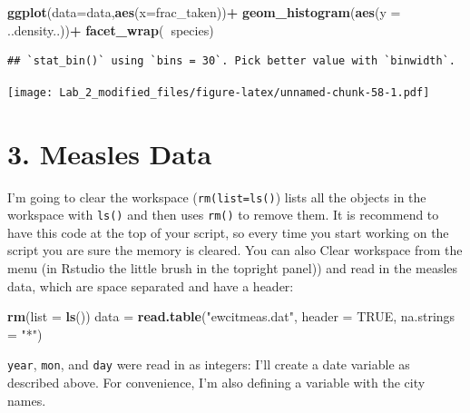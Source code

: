 \documentclass[11pt,]{article}
\newenvironment{Shaded}{\begin{snugshade}}{\end{snugshade}}
\newcommand{\KeywordTok}[1]{\textcolor[rgb]{0.13,0.29,0.53}{\textbf{#1}}}
\newcommand{\DataTypeTok}[1]{\textcolor[rgb]{0.13,0.29,0.53}{#1}}
\newcommand{\DecValTok}[1]{\textcolor[rgb]{0.00,0.00,0.81}{#1}}
\newcommand{\StringTok}[1]{\textcolor[rgb]{0.31,0.60,0.02}{#1}}
\newcommand{\OtherTok}[1]{\textcolor[rgb]{0.56,0.35,0.01}{#1}}
\newcommand{\OperatorTok}[1]{\textcolor[rgb]{0.81,0.36,0.00}{\textbf{#1}}}
\newcommand{\NormalTok}[1]{#1}
\begin{document}
\begin{Shaded}
\begin{Highlighting}[]
\KeywordTok{ggplot}\NormalTok{(}\DataTypeTok{data=}\NormalTok{data,}\KeywordTok{aes}\NormalTok{(}\DataTypeTok{x=}\NormalTok{frac_taken))}\OperatorTok{+}
\StringTok{  }\KeywordTok{geom_histogram}\NormalTok{(}\KeywordTok{aes}\NormalTok{(}\DataTypeTok{y =}\NormalTok{ ..density..))}\OperatorTok{+}
\StringTok{  }\KeywordTok{facet_wrap}\NormalTok{(}\OperatorTok{~}\NormalTok{species)}
\end{Highlighting}
\end{Shaded}

\begin{verbatim}
## `stat_bin()` using `bins = 30`. Pick better value with `binwidth`.
\end{verbatim}

\texttt{[image: Lab\_2\_modified\_files/figure-latex/unnamed-chunk-58-1.pdf]}

\section{3. Measles Data}\label{measles-data}

I'm going to clear the workspace (\texttt{rm(list=ls()}) lists all the
objects in the workspace with \texttt{ls()} and then uses \texttt{rm()}
to remove them. It is recommend to have this code at the top of your
script, so every time you start working on the script you are sure the
memory is cleared. You can also Clear workspace from the menu (in
Rstudio the little brush in the topright panel)) and read in the measles
data, which are space separated and have a header:

\begin{Shaded}
\begin{Highlighting}[]
\KeywordTok{rm}\NormalTok{(}\DataTypeTok{list =} \KeywordTok{ls}\NormalTok{())}
\NormalTok{data =}\StringTok{ }\KeywordTok{read.table}\NormalTok{(}\StringTok{"ewcitmeas.dat"}\NormalTok{, }\DataTypeTok{header =} \OtherTok{TRUE}\NormalTok{, }\DataTypeTok{na.strings =} \StringTok{"*"}\NormalTok{)}
\end{Highlighting}
\end{Shaded}

\texttt{year}, \texttt{mon}, and \texttt{day} were read in as integers:
I'll create a date variable as described above. For convenience, I'm
also defining a variable with the city names.

\begin{Shaded}
\end{Shaded}
\end{document}
